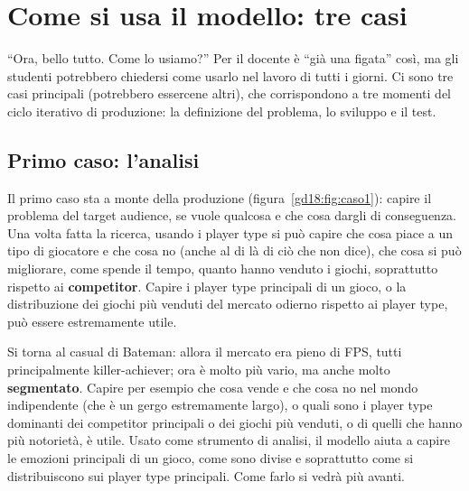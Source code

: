 \section{Come si usa il modello: tre casi}
\label{gd18:sec:casi}

``Ora, bello tutto. Come lo usiamo?'' Per il docente è ``già una figata'' così, ma gli
studenti potrebbero chiedersi come usarlo nel lavoro di tutti i giorni. Ci sono tre
casi principali (potrebbero essercene altri), che corrispondono a tre momenti del
ciclo iterativo di produzione: la definizione del problema, lo sviluppo e il test.


\subsection{Primo caso: l'analisi}

Il primo caso sta a monte della produzione (figura~\ref{gd18:fig:caso1}): capire il
problema del target audience, se vuole qualcosa e che cosa dargli di conseguenza. Una
volta fatta la ricerca, usando i player type si può capire che cosa piace a un tipo
di giocatore e che cosa no (anche al di là di ciò che non dice), che cosa si può
migliorare, come spende il tempo, quanto hanno venduto i giochi, soprattutto rispetto
ai \textbf{competitor}. Capire i player type principali di un gioco, o la
distribuzione dei giochi più venduti del mercato odierno rispetto ai player type, può
essere estremamente utile.

Si torna al casual di Bateman: allora il mercato era pieno di FPS, tutti
principalmente killer-achiever; ora è molto più vario, ma anche molto
\textbf{segmentato}. Capire per esempio che cosa vende e che cosa no nel mondo
indipendente (che è un gergo estremamente largo), o quali sono i player type
dominanti dei competitor principali o dei giochi più venduti, o di quelli che hanno
più notorietà, è utile. Usato come strumento di analisi, il modello aiuta a capire le
emozioni principali di un gioco, come sono divise e soprattutto come si distribuiscono
sui player type principali. Come farlo si vedrà più avanti.


